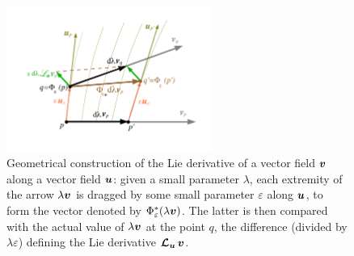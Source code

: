 \begin{figure}
\centerline{\includegraphics[width=0.6\textwidth]{bas_lie_deriv.pdf}}
\caption[]{\label{f:bas:deriv}
\footnotesize
Geometrical construction of the Lie derivative of a
vector field $\bm{v}$ along a vector field $\bm{u}$:
given a small parameter $\lambda$, each extremity of the arrow
$\lambda\bm{v}$ is dragged by some small parameter $\varepsilon$
along $\bm{u}$, to form
the vector denoted by $\Phi_\varepsilon^*(\lambda\bm{v})$. The latter is then compared with
the actual value of $\lambda\bm{v}$ at the point $q$, the difference (divided
by $\lambda\varepsilon$) defining the Lie derivative $\bm{\mathcal{L}}_{\bm{u}}\,\bm{v}$.}
\end{figure}


